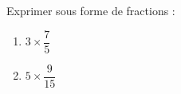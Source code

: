 
\begin{mental}
    Exprimer sous forme de fractions :
        \begin{enumerate}
            \item
                \( 3\times \dfrac{ 7 }{ 5 }\)
            \item
                \( 5\times \dfrac{ 9 }{ 15 }\)
        \end{enumerate}
\end{mental}
